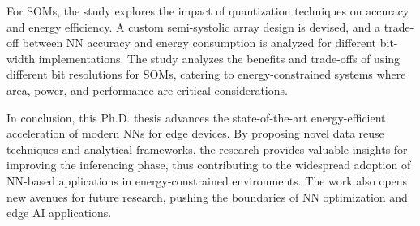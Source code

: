 For SOMs, the study explores the impact of quantization techniques on accuracy and energy efficiency. A custom semi-systolic array design is devised, and a trade-off between NN accuracy and energy consumption is analyzed for different bit-width implementations. The study analyzes the benefits and trade-offs of using different bit resolutions for SOMs, catering to energy-constrained systems where area, power, and performance are critical considerations.

In conclusion, this Ph.D. thesis advances the state-of-the-art energy-efficient acceleration of modern NNs for edge devices. By proposing novel data reuse techniques and analytical frameworks, the research provides valuable insights for improving the inferencing phase, thus contributing to the widespread adoption of NN-based applications in energy-constrained environments. The work also opens new avenues for future research, pushing the boundaries of NN optimization and edge AI applications.